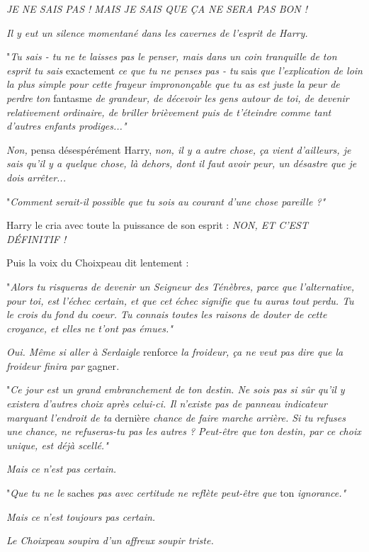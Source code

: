 \emph{JE NE SAIS PAS ! MAIS JE SAIS QUE ÇA NE SERA PAS BON !} 

\emph{Il y eut un silence momentané dans les cavernes de l'esprit de Harry.} 

"\emph{Tu sais - tu ne te laisses pas le penser, mais dans un coin tranquille de ton esprit tu sais } exactement\emph{ ce que tu ne penses pas - tu } sais\emph{ que l'explication de loin la plus simple pour cette frayeur imprononçable que tu as est juste la peur de perdre ton } fantasme\emph{ de grandeur, de décevoir les gens autour de toi, de devenir relativement ordinaire, de briller brièvement puis de t'éteindre comme tant d'autres enfants prodiges..."} 

\emph{Non,}  pensa désespérément Harry, \emph{non, il y a autre chose, ça vient d'ailleurs, je sais qu'il y a quelque chose, là dehors, dont il faut avoir peur, un désastre que je dois arrêter...} 

"\emph{Comment serait-il possible que tu sois au courant d'une chose pareille ?"} 

Harry le cria avec toute la puissance de son esprit : \emph{NON, ET C'EST DÉFINITIF !} 

Puis la voix du Choixpeau dit lentement :

"\emph{Alors tu risqueras de devenir un Seigneur des Ténèbres, parce que l'alternative, pour toi, est l'échec certain, et que cet échec signifie que tu auras tout perdu. Tu le crois du fond du coeur. Tu connais toutes les raisons de douter de cette croyance, et elles ne t'ont pas émues."} 

\emph{Oui. Même si aller à Serdaigle } renforce\emph{ la froideur, ça ne veut pas dire que la froideur finira par } gagner\emph{.} 

"\emph{Ce jour est un grand embranchement de ton destin. Ne sois pas si sûr qu'il y existera d'autres choix après celui-ci. Il n'existe pas de panneau indicateur marquant l'endroit de ta } dernière\emph{ chance de faire marche arrière. Si tu refuses une chance, ne refuseras-tu pas les autres ? Peut-être que ton destin, par ce choix unique, est déjà scellé."} 

\emph{Mais ce n'est pas certain.} 

"\emph{Que tu ne le } saches\emph{ pas avec certitude ne reflète peut-être que } ton\emph{ ignorance."} 

\emph{Mais ce n'est toujours pas certain.} 

\emph{Le Choixpeau soupira d'un affreux soupir triste.} 

